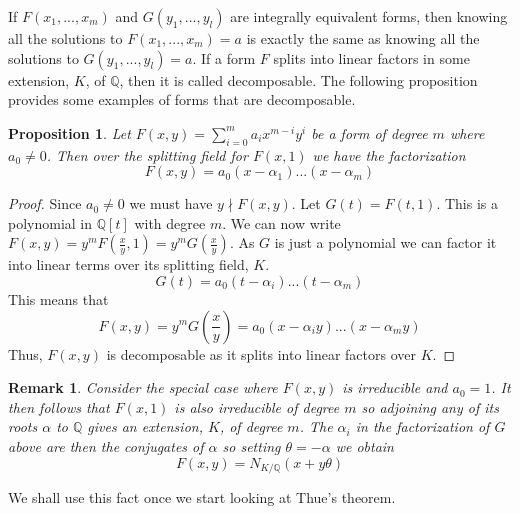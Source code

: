 \documentclass{article}
\newtheorem{proposition}{Proposition}[section]
\newtheorem{remark}{Remark}[section]
\newcommand{\mbb}[1]{\mathbb{#1}}
\numberwithin{equation}{section}
\begin{document}



If $F(x_1, ..., x_m)$ and $G(y_1, ..., y_l)$ are integrally equivalent forms, then knowing all the solutions to $F(x_1, ..., x_m) = a$ is exactly the same as knowing all the solutions to $G(y_1, ..., y_l) = a$. If a form $F$ splits into linear factors in some extension, $K$, of $\mbb{Q}$, then it is called decomposable.
The following proposition provides some examples of forms that are decomposable.

\begin{proposition}\label{prop: Forms of two variables are decomposable}
    Let $F(x,y) = \sum_{i=0}^m a_i x^{m-i}y^{i}$ be a form of degree $m$ where $a_0 \neq 0$. Then over the splitting field for $F(x,1)$ we have the factorization
    $$F(x, y) = a_0(x - \alpha_1)...(x - \alpha_m)$$
\end{proposition}
\begin{proof}
    Since $a_0 \neq 0$ we must have $y \nmid F(x, y)$. Let $G(t) = F(t, 1)$. This is a polynomial in $\mbb Q[t]$ with degree $m$. We can now write
    $F(x, y) = y^mF(\frac{x}{y}, 1) = y^m G(\frac{x}{y})$. As $G$ is just a polynomial we can factor it into linear terms over its splitting field, $K$.
    $$G(t) = a_0 (t - \alpha_i) ... (t - \alpha_m)$$
    This means that
    $$F(x,y) = y^mG(\frac{x}{y}) =  a_0 (x - \alpha_iy) ... (x - \alpha_m y)$$
    Thus, $F(x,y)$ is decomposable as it splits into linear factors over $K$.
\end{proof}
\begin{remark}\label{remark: Forms of two variables are decomposable}
    Consider the special case where $F(x,y)$ is irreducible and $a_0 = 1$. It then follows that $F(x,1)$ is also irreducible of degree $m$ so adjoining any of its roots $\alpha$ to $\mbb Q$ gives an extension, $K$, of degree $m$. The $\alpha_i$ in the factorization of $G$ above are then the conjugates of $\alpha$ so setting $\theta = -\alpha$ we obtain
    $$F(x,y) = N_{K / \mbb Q}(x + y \theta)$$
\end{remark}

We shall use this fact once we start looking at Thue's theorem.
\end{document}

